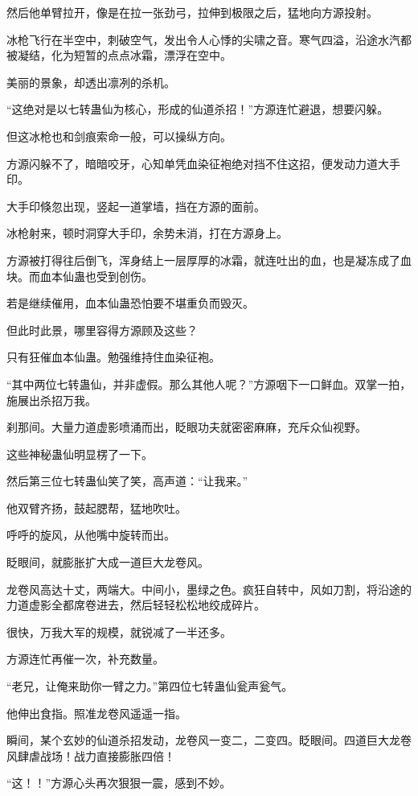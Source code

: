 \begin{this_body}
然后他单臂拉开，像是在拉一张劲弓，拉伸到极限之后，猛地向方源投射。

冰枪飞行在半空中，刺破空气，发出令人心悸的尖啸之音。寒气四溢，沿途水汽都被凝结，化为短暂的点点冰霜，漂浮在空中。

美丽的景象，却透出凛冽的杀机。

“这绝对是以七转蛊仙为核心，形成的仙道杀招！”方源连忙避退，想要闪躲。

但这冰枪也和剑痕索命一般，可以操纵方向。

方源闪躲不了，暗暗咬牙，心知单凭血染征袍绝对挡不住这招，便发动力道大手印。

大手印倏忽出现，竖起一道掌墙，挡在方源的面前。

冰枪射来，顿时洞穿大手印，余势未消，打在方源身上。

方源被打得往后倒飞，浑身结上一层厚厚的冰霜，就连吐出的血，也是凝冻成了血块。而血本仙蛊也受到创伤。

若是继续催用，血本仙蛊恐怕要不堪重负而毁灭。

但此时此景，哪里容得方源顾及这些？

只有狂催血本仙蛊。勉强维持住血染征袍。

“其中两位七转蛊仙，并非虚假。那么其他人呢？”方源咽下一口鲜血。双掌一拍，施展出杀招万我。

刹那间。大量力道虚影喷涌而出，眨眼功夫就密密麻麻，充斥众仙视野。

这些神秘蛊仙明显楞了一下。

然后第三位七转蛊仙笑了笑，高声道：“让我来。”

他双臂齐扬，鼓起腮帮，猛地吹吐。

呼呼的旋风，从他嘴中旋转而出。

眨眼间，就膨胀扩大成一道巨大龙卷风。

龙卷风高达十丈，两端大。中间小，墨绿之色。疯狂自转中，风如刀割，将沿途的力道虚影全都席卷进去，然后轻轻松松地绞成碎片。

很快，万我大军的规模，就锐减了一半还多。

方源连忙再催一次，补充数量。

“老兄，让俺来助你一臂之力。”第四位七转蛊仙瓮声瓮气。

他伸出食指。照准龙卷风遥遥一指。

瞬间，某个玄妙的仙道杀招发动，龙卷风一变二，二变四。眨眼间。四道巨大龙卷风肆虐战场！战力直接膨胀四倍！

“这！！”方源心头再次狠狠一震，感到不妙。


\end{this_body}
